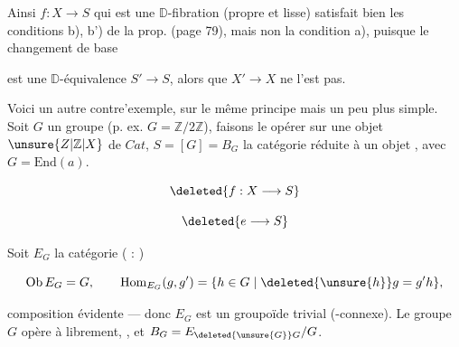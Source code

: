 
Ainsi $f:X\longrightarrow S$ qui est une $\mathbb D$-fibration (propre et lisse) satisfait bien les conditions  b), b') de la prop.  (page 79), mais non la condition a), puisque le changement de base


est une $\mathbb D$-équivalence $S'\to S$, alors que $X'\to X$ ne l'est pas.

Voici un autre contre'exemple, sur le même principe mais un peu plus simple. Soit $G$ un groupe   (p. ex. $G=\mathbb Z/2\mathbb Z$), faisons le opérer sur une  objet $\unsure{Z|\mathbb Z|X}$ de $\mathit{Cat}$,  $S=[G]=B_G$ la catégorie réduite à un objet , avec $G=\mathrm{End}(a)$.


\[
\deleted{f:X\longrightarrow S}
\]


\[
\deleted{e\longrightarrow S}
\]

 Soit $E_G$ la catégorie   ( : )

\[
\mathrm{Ob}\,E_G=G,\qquad \mathrm{Hom}_{E_G}(g,g')=\{h\in G\mid\deleted{\unsure{h}}g=g'h\},
\]

composition évidente --- donc $E_G$ est un groupoïde trivial (-connexe). Le groupe $G$  opère à  librement, , et $B_G=E_{\deleted{\unsure{G}}G}/G$.

